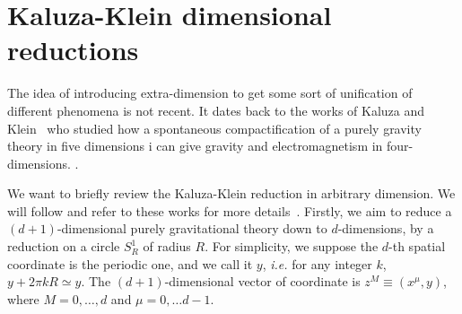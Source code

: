 \documentclass[debug]{phd}
\begin{document}
		\section{Kaluza-Klein dimensional reductions}
%			
			The idea of introducing extra-dimension to get some sort of unification of different phenomena is not recent.
			It dates back to the works of Kaluza and Klein~\cite{Kaluza, Klein} who studied how a spontaneous compactification of  a purely gravity theory in five dimensions i
			can give gravity and electromagnetism in four-dimensions. .
			
			We want to briefly review the Kaluza-Klein reduction in arbitrary dimension.
			We will follow and refer to these works for more details~\cite{stellereview, popeKK}.
			Firstly, we aim to reduce a $(d+1)$-dimensional purely gravitational theory down to $d$-dimensions, by a reduction on a circle $S^1_R$ of radius $R$.
			For simplicity, we suppose the $d$-th spatial coordinate is the periodic one, and we call it $y$, \emph{i.e.} for any integer $k$, $y + 2\pi k R \simeq y$.
			The $(d+1)$-dimensional vector of coordinate is $z^M \equiv (x^\mu , y)$, where $M = 0,\ldots, d$ and $\mu = 0, \ldots d-1$.
			
\end{document}
